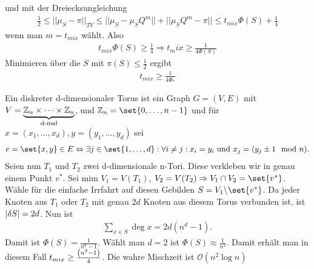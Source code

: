 \begin{beweis}
 	und mit der Dreiecksungleichung 
 	\begin{align}
 		\frac{1}{2} \leq || \mu_S - \pi ||_{TV} \leq || \mu_S - \mu_SQ^m || + || \mu_SQ^m-\pi || \leq t_{mix}\Phi(S) + \frac{1}{4}
  	\end{align}
  	wenn man $m = t_{mix}$ wählt. Also
  	\begin{align}
  		t_{mix} \Phi(S) \geq \frac{1}{4} \Rightarrow t_mix \geq \frac{1}{4\Phi(S)}
  	\end{align}
  	Minimieren über die $S$ mit $\pi(S) \leq \frac{1}{2}$ ergibt 
  	\begin{align}
  		t_{mix} \geq \frac{1}{4\Phi_*}
  	\end{align}
\end{beweis}

\begin{beispiel}
	Ein diskreter d-dimensionaler Torus ist ein Graph $G = (V,E)$ mit $V = \underbrace{\mathbb{Z}_n \times \dots \times \mathbb{Z}_n}_{\text{d-mal}}$, und $\ZZ_n = \set{0,\dots,n-1}$ und für $x = (x_1,\dots,x_d), y = (y_1,\dots,y_d)$ sei 
	\begin{align}
		e = \set{x,y} \in E \Leftrightarrow \exists j \in \set{1,\dots,d} :\forall i \neq j: x_i = y_i  \text{ und } x_j = (y_j \pm 1 \mod{n}).
	\end{align} 
	Seien nun $T_1$ und $T_2$ zwei d-dimensionale n-Tori. Diese verkleben wir in genau einem Punkt $v^*$. Sei mim $V_1 = V(T_1)$, $V_2 = V(T_2) \Rightarrow V_1 \cap V_2 = \set{v^*}$. Wähle für die einfache Irrfahrt auf diesen Gebilden $S = V_1\backslash \set{v^*}$. Da jeder Knoten aus $T_1$ oder $T_2$ mit genau $2d$ Knoten aus diesem Torus verbunden ist, ist $\lvert\delta S\rvert = 2d$. Nun ist 
	\begin{align}
		\sum\limits_{x \in S} \deg{x} = 2d(n^d-1). 
	\end{align}
	Damit ist $\Phi(S) = \frac{1}{n^d - 1}$. Wählt man $d = 2$ ist $\Phi(S) \approx \frac{1}{n^2}$. Damit erhält man in diesem Fall $t_{mix} \geq \frac{\left(n^2-1\right)}{4}$. Die wahre Mischzeit ist $\mathcal{O}(n^2 \log n)$
\end{beispiel}

